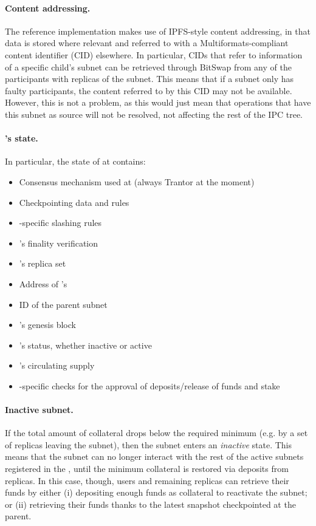 \paragraph{Content addressing.} The reference implementation makes use of IPFS-style content addressing, in that data is stored where relevant and referred to with a Multiformats-compliant content identifier (CID) elsewhere. In particular, CIDs that refer to information of a specific child's subnet can be retrieved through BitSwap from any of the participants with replicas of the subnet. This means that if a subnet only has faulty participants, the content referred to by this CID may not be available. However, this is not a problem, as this would just mean that operations that have this subnet as source will not be resolved, not affecting the rest of the IPC tree. 

\paragraph{\sa's state.} In particular, the state of  at  contains: 
\begin{itemize}
    \item Consensus mechanism used at  (always Trantor at the moment) 
    \item Checkpointing data and rules
    \item {}-specific slashing rules
    \item {}'s finality verification
    \item {}'s replica set
    \item Address of 's \gw 
    \item ID of the parent subnet 
    \item {}'s genesis block
    \item {}'s status, whether inactive or active
    \item {}'s circulating supply
    \item {}-specific checks for the approval of deposits/release of funds and stake
\end{itemize} 
\paragraph{Inactive subnet.} If the total amount of collateral drops below the required minimum (e.g. by a set of replicas leaving the subnet), then the subnet enters an \emph{inactive} state. This means that the subnet can no longer interact with the rest of the active subnets registered in the \gw, until the minimum collateral is restored via deposits from replicas. In this case, though, users and remaining replicas can retrieve their funds by either (i) depositing enough funds as collateral to reactivate the subnet; or (ii) retrieving their funds thanks to the latest snapshot checkpointed at the parent.

